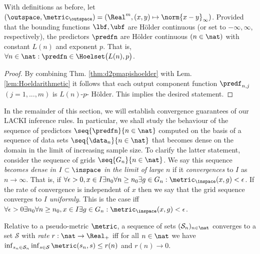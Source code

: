\begin{lem}
With definitions as before, let $(\outspace,\metric_\outspace) = (\Real^m,(x,y) \mapsto \norm{x-y}_\infty)$.
Provided that the bounding functions $\lbf,\ubf$ are H\"older continuous (or set to $-\infty,\infty$, respectively),
the predictors $\predfn$ are H\"older continuous $(n \in \nat)$ with constant $L(n)$ and exponent $p$. That is, $\forall n \in \nat: \predfn \in \Hoelset \bigl(L(n),p\bigr)$.

\begin{proof}
By combining Thm. \ref{thm:d2pmapishoelder} with Lem. \ref{lem:Hoeldarithmetic} it follows that each output component function $\predf_{n,j}$ $(j=1,...,m)$ is $L(n)$-$p$- H\"older. This implies the desired statement. 

\end{proof} 
\label{lem:LACKIpredHoelder}
\end{lem}

In the remainder of this section, we will establish convergence guarantees of our LACKI inference rules. In particular, we shall study the behaviour of the sequence of predictors $\seq{\predfn}{n \in \nat}$ computed on the basis of a sequence of data sets $\seq{\data_n}{n \in \nat}$ that becomes dense on the domain in the limit of increasing sample size. To clarify the latter statement, consider the sequence of grids $\seq{G_n}{n \in \nat}$. We say this sequence \emph{becomes dense in $I \subset \inspace$ in the limit of large $n$ }if it \emph{convergences} to $I$ as $n \to \infty$. That is, if $\forall \epsilon >0,x \in I \exists n_0 \forall n \geq n_0 \exists g \in G_n: \metric_\inspace(x,g) < \epsilon$. If the rate of convergence is independent of $x$ then we say that the grid sequence converges to $I$ \emph{uniformly}. This is the case iff $\forall \epsilon >0 \exists n_0 \forall n \geq n_0, x \in I \exists g \in G_n: \metric_\inspace(x,g) < \epsilon$.

\begin{defn}
Relative to a pseudo-metric $\metric$, a sequence of sets $(\mathcal S_n)_{n \in \nat}$ converges to a set $\mathcal S$ with \emph{rate} $r: \nat \to \Real_+$ iff for all $n \in \nat$ we have $\inf_{s_n \in \mathcal S_n}\inf_{s\in \mathcal S} \metric(s_n,s)\leq r(n)$ and $r(n) \to 0$.
\end{defn}


